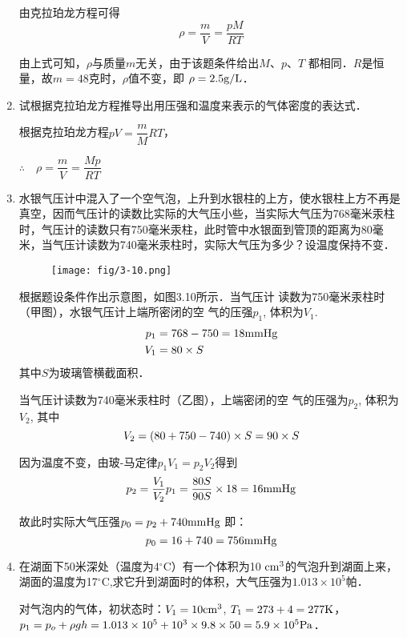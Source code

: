 \begin{enumerate}
\begin{solution}
由克拉珀龙方程可得
\[\rho=\dfrac{m}{V}=\dfrac{pM}{RT}\]

由上式可知，$\rho$与质量$m$无关，由于该题条件给出$M$、$p$、$T$
都相同．$R$是恒量，故$m=48$克时，$\rho$值不变，即
$\rho=2.5{\rm g/L}$．
\end{solution}
\item   试根据克拉珀龙方程推导出用压强和温度来表示的气体密度的表达式．

\begin{solution}
    根据克拉珀龙方程$pV=\dfrac{m}{M}RT$，

    $\therefore\quad \rho=\dfrac{m}{V}=\dfrac{Mp}{RT}$
\end{solution}
\item  水银气压计中混入了一个空气泡，上升到水银柱的上方，使水银柱上方不再是真空，因而气压计的读数比实际的大气压小些，当实际大气压为768毫米汞柱时，气压计的读数只有750毫米汞柱，此时管中水银面到管顶的距离为80毫米，当气压计读数为740毫米汞柱时，实际大气压为多少？设温度保持不变．

\begin{figure}[htp]
    \centering
\texttt{[image: fig/3-10.png]}
    \caption{}
\end{figure}

\begin{solution}
    根据题设条件作出示意图，如图3.10所示．当气压计
读数为750毫米汞柱时（甲图），水银气压计上端所密闭的空
气的压强$p_1$, 体积为$V_1$.
\[\begin{split}
    p_1&=768-750=18{\rm mmHg}\\
    V_1&=80\times S
\end{split}\]
其中$S$为玻璃管横截面积．

当气压计读数为740毫米汞柱时（乙图），上端密闭的空
气的压强为$p_2$, 体积为$V_2$, 其中
\[V_2=(80+750-740)\times S=90\times S\]

因为温度不变，由玻-马定律$p_1V_1=p_2V_2$得到
\[p_2=\frac{V_1}{V_2}p_1=\frac{80S}{90S}\times 18=16{\rm mmHg}\]

故此时实际大气压强$p_0=p_2+740{\rm mmHg}$
即：
\[p_0=16+740=756{\rm mmHg}\]

\end{solution}
\item  在湖面下50米深处（温度为4$^\circ$C）有一个体积为10
${\rm cm^3}$的气泡升到湖面上来，湖面的温度为17$^\circ$C,求它升到湖面时的体积，大气压强为$1.013\times 10^5$帕．

\begin{solution}
    对气泡内的气体，初状态时：$V_1=10{\rm cm^3}$, $T_1=273
+4=277{\rm K}$，$p_1=p_o+\rho gh=1.013\times10^5+10^3\times9.8\times50=
5.9\times10^5{\rm Pa}$．


\end{solution}
\end{enumerate}
